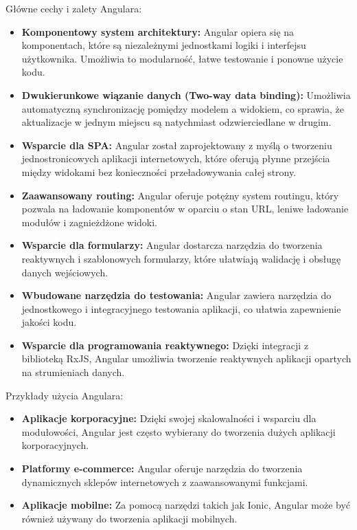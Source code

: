 Główne cechy i zalety Angulara:
\begin{itemize}
\item \textbf{Komponentowy system architektury:} Angular opiera się na komponentach, które są niezależnymi jednostkami logiki i interfejsu użytkownika. Umożliwia to modularność, łatwe testowanie i ponowne użycie kodu.

\item \textbf{Dwukierunkowe wiązanie danych (Two-way data binding):} Umożliwia automatyczną synchronizację pomiędzy modelem a widokiem, co sprawia, że aktualizacje w jednym miejscu są natychmiast odzwierciedlane w drugim.

\item \textbf{Wsparcie dla SPA:} Angular został zaprojektowany z myślą o tworzeniu jednostronicowych aplikacji internetowych, które oferują płynne przejścia między widokami bez konieczności przeładowywania całej strony.

\item \textbf{Zaawansowany routing:} Angular oferuje potężny system routingu, który pozwala na ładowanie komponentów w oparciu o stan URL, leniwe ładowanie modułów i zagnieżdżone widoki.

\item \textbf{Wsparcie dla formularzy:} Angular dostarcza narzędzia do tworzenia reaktywnych i szablonowych formularzy, które ułatwiają walidację i obsługę danych wejściowych.

\item \textbf{Wbudowane narzędzia do testowania:} Angular zawiera narzędzia do jednostkowego i integracyjnego testowania aplikacji, co ułatwia zapewnienie jakości kodu.

\item \textbf{Wsparcie dla programowania reaktywnego:} Dzięki integracji z biblioteką RxJS, Angular umożliwia tworzenie reaktywnych aplikacji opartych na strumieniach danych.
\end{itemize}

Przykłady użycia Angulara:
\begin{itemize}
\item \textbf{Aplikacje korporacyjne:} Dzięki swojej skalowalności i wsparciu dla modułowości, Angular jest często wybierany do tworzenia dużych aplikacji korporacyjnych.

\item \textbf{Platformy e-commerce:} Angular oferuje narzędzia do tworzenia dynamicznych sklepów internetowych z zaawansowanymi funkcjami.

\item \textbf{Aplikacje mobilne:} Za pomocą narzędzi takich jak Ionic, Angular może być również używany do tworzenia aplikacji mobilnych.
\end{itemize}

